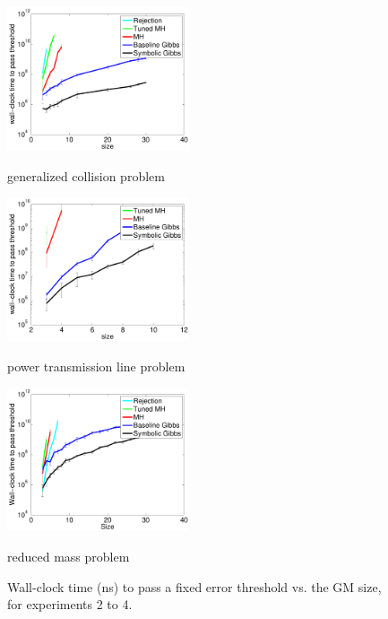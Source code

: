 \documentclass{article}
\begin{document}
\begin{figure}
\begin{center}
\begin{minipage}[b]{0.33\textwidth}
 \includegraphics[width=1\linewidth, height=120pt]{Figs/plots/collision/time_vs_param-errorbar.pdf}
\caption{generalized collision problem}
\label{fig:err-threshold-vs-size-collision}
\end{minipage}
%
\begin{minipage}[b]{0.33\textwidth}
\includegraphics[width=1\linewidth, height=120pt]{Figs/plots/fermentation/time_vs_param-errorbar.pdf}
\caption{power transmission line problem}
\label{fig:err-threshold-vs-size-alc}
\end{minipage}
\begin{minipage}[b]{0.33\textwidth}
\includegraphics[width=1\linewidth, height=120pt]{Figs/plots/circuits/time_vs_param-errorbar.pdf}
\caption{reduced mass problem}
\label{fig:err-threshold-vs-size-circuit}
\end{minipage}
\end{center}
\caption{Wall-clock time (ns) to pass a fixed error threshold vs. the GM size, for experiments 2 to 4.}
\end{figure}
\end{document}
